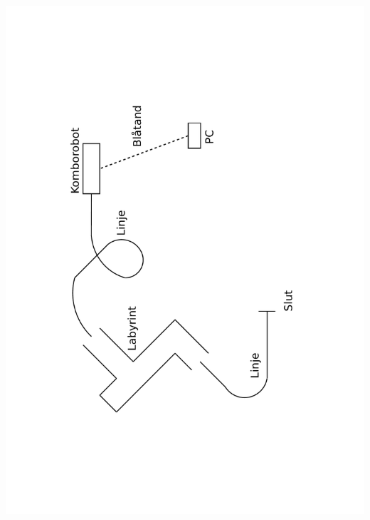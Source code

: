 \documentclass[a4paper,12pt]{article}
\begin{document}
\includegraphics[angle=270,scale=0.5]{Oversikt.pdf}
\end{document}
